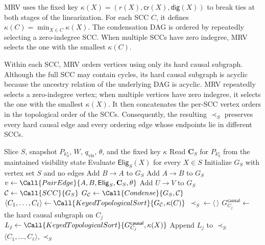 MRV uses the fixed key $\kappa(X)=(r(X),\mathsf{cr}(X),\mathsf{dig}(X))$ to break ties at both stages of the linearization. For each SCC $C$, it defines $\kappa(C)=\min_{X\in C}\kappa(X)$. The condensation DAG is ordered by repeatedly selecting a zero-indegree SCC. When multiple SCCs have zero indegree, MRV selects the one with the smallest $\kappa(C)$.

Within each SCC, MRV orders vertices using only its hard causal subgraph. Although the full SCC may contain cycles, its hard causal subgraph is acyclic because the ancestry relation of the underlying DAG is acyclic. MRV repeatedly selects a zero-indegree vertex; when multiple vertices have zero indegree, it selects the one with the smallest $\kappa(X)$. It then concatenates the per-SCC vertex orders in the topological order of the SCCs. Consequently, the resulting $\prec_S$ preserves every hard causal edge and every ordering edge whose endpoints lie in different SCCs.

\begin{algorithm}
\caption{MRV ordering for one execution slice}
\label{alg:order_slice}
\begin{algorithmic}[1]
\Require Slice $S$, snapshot $P_{k^\star_S}$, $W$,
         $q_{\mathrm{vis}}$, $\theta$, and the fixed key $\kappa$
\State Read $\mathbf{C}_S$ for $P_{k^\star_S}$ from the maintained
       visibility state
\State Evaluate $\mathsf{Elig}_S(X)$ for every $X\in S$
\State Initialize $G_S$ with vertex set $S$ and no edges
        \State Add $B\to A$ to $G_S$
        \State Add $A\to B$ to $G_S$
    \Else
        \State $v\gets
          \Call{PairEdge}{A,B,\mathsf{Elig}_S,\mathbf{C}_S,\theta}$
            \State Add $U\to V$ to $G_S$
        \EndIf
    \EndIf
\EndFor
\State $\mathcal{C}\gets\Call{SCC}{G_S}$
\State $G_{\mathcal{C}}\gets\Call{Condense}{G_S,\mathcal{C}}$
\State $\langle C_1,\ldots,C_\ell\rangle\gets
       \Call{KeyedTopologicalSort}{G_{\mathcal{C}},\kappa(C)}$
\State $\prec_S\gets\langle\,\rangle$
    \State $G^{\mathsf{causal}}_{C_j}\gets$
           the hard causal subgraph on $C_j$
    \State $L_j\gets
      \Call{KeyedTopologicalSort}
      {G^{\mathsf{causal}}_{C_j},\kappa(X)}$
    \State Append $L_j$ to $\prec_S$
\EndFor
\State \Return $\langle C_1,\ldots,C_\ell\rangle,\prec_S$
\end{algorithmic}
\end{algorithm}

